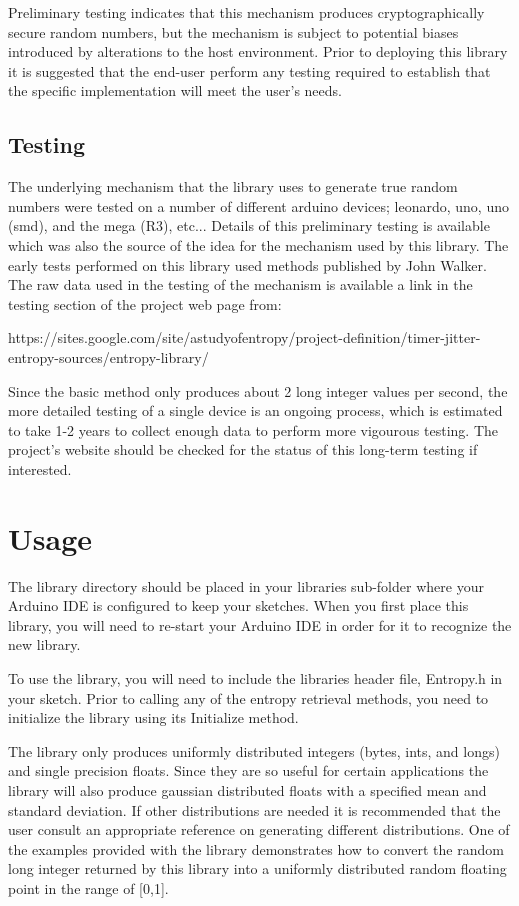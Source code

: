 \documentclass[10pt]{report}
\begin{document}
Preliminary testing indicates that this mechanism produces cryptographically secure random numbers, but the 
mechanism is subject to potential biases introduced by alterations to the host environment.  Prior to 
deploying this library it is suggested that the end-user perform any testing required to establish that the 
specific implementation will meet the user's needs.

\section{Testing}

The underlying mechanism that the library uses to generate true random numbers were tested on a number of 
different arduino devices; leonardo, uno, uno (smd), and the mega (R3), etc...  Details of this preliminary 
testing is available \cite{ARDWDTRN} which was also the source of the idea for the mechanism used by this library. 
The early tests performed on this library used methods published by John Walker. \cite{Walker2011} The raw 
data used in the testing of the mechanism is available a link in the testing section of the project web page 
from:

{\tiny https://sites.google.com/site/astudyofentropy/project-definition/timer-jitter-entropy-sources/entropy-library/ }

Since the basic method only produces about 2 long integer values per second, the more detailed testing of a single 
device is an ongoing process, which is estimated to take 1-2 years to collect enough data to perform more vigourous
testing.  The project's website should be checked for the status of this long-term testing if interested.

\chapter{Usage}

The library directory should be placed in your libraries sub-folder where your Arduino IDE is configured to 
keep your sketches.  When you first place this library, you will need to re-start your Arduino IDE in order 
for it to recognize the new library.

To use the library, you will need to include the libraries header file, Entropy.h in your sketch.  Prior 
to calling any of the entropy retrieval methods, you need to initialize the library using its Initialize 
method.

The library only produces uniformly distributed integers (bytes, ints, and longs) and single precision floats.  
Since they are so useful for certain applications the library will also produce gaussian distributed floats with
a specified mean and standard deviation.  If other distributions are needed it is recommended that the user 
consult an appropriate reference \cite{Matloff2006} on generating different distributions.  One of the examples 
provided with the library demonstrates how to convert the random long integer returned by this library into a 
uniformly distributed random floating point in the range of [0,1].
\end{document}
